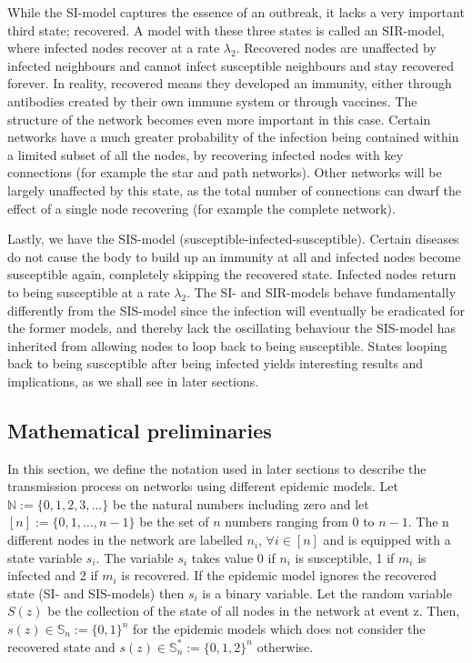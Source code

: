 \documentclass[12pt]{article} %
\numberwithin{equation}{section}
\begin{document}
While the SI-model captures the essence of an outbreak, it lacks a very important third state; recovered. A model with these three states is called an SIR-model, where infected nodes recover at a rate $\lambda_2$. Recovered nodes are unaffected by infected neighbours and cannot infect susceptible neighbours and stay recovered forever. In reality, recovered means they developed an immunity, either through antibodies created by their own immune system or through vaccines. The structure of the network becomes even more important in this case. Certain networks have a much greater probability of the infection being contained within a limited subset of all the nodes, by recovering infected nodes with key connections (for example the star and path networks). Other networks will be largely unaffected by this state, as the total number of connections can dwarf the effect of a single node recovering (for example the complete network). 

Lastly, we have the SIS-model (susceptible-infected-susceptible). Certain diseases do not cause the body to build up an immunity at all and infected nodes become susceptible again, completely skipping the recovered state. Infected nodes return to being susceptible at a rate $\lambda_2$. The SI- and SIR-models behave fundamentally differently from the SIS-model since the infection will eventually be eradicated for the former models, and thereby lack the oscillating behaviour the SIS-model has inherited from allowing nodes to loop back to being susceptible. States looping back to being susceptible after being infected yields interesting results and implications, as we shall see in later sections.

\subsection{Mathematical preliminaries}\label{prelim}
In this section, we define the notation used in later sections to describe the transmission process on networks using different epidemic models. Let $\mathbb{N} := \{0,1,2,3,\dots\}$ be the natural numbers including zero and let $[n] := \{0,1,\dots,n-1\}$ be the set of $n$ numbers ranging from $0$ to $n-1$. The n different nodes in the network are labelled $n_i$, $\forall i\in [n]$ and is equipped with a state variable $s_i$. The variable $s_i$ takes value 0 if $n_i$ is susceptible, 1 if $m_i$ is infected and 2 if $m_i$ is recovered. If the epidemic model ignores the recovered state (SI- and SIS-models) then $s_i$ is a binary variable. Let the random variable $S(z)$ be the collection of the state of all nodes in the network at event z. Then, $s(z) \in \mathbb{S}_n := \{0,1\}^n$ for the epidemic models which does not consider the recovered state and $s(z) \in \mathbb{S}_n^* := \{0,1,2\}^n$ otherwise.
\end{document}
